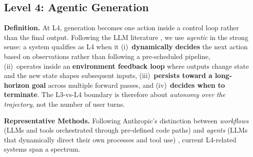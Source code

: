 \documentclass{llmxive}
\begin{document}

\subsection{Level 4: Agentic Generation}
\label{subsec:level4}



\textbf{Definition.} At L4, generation becomes one action inside a control loop rather than the final output. Following the LLM literature \citep{anthropic2024agents}, we use \emph{agentic} in the strong sense: a system qualifies as L4 when it (i)~\textbf{dynamically decides} the next action based on observations rather than following a pre-scheduled pipeline, (ii)~operates inside an \textbf{environment feedback loop} where outputs change state and the new state shapes subsequent inputs, (iii)~\textbf{persists toward a long-horizon goal} across multiple forward passes, and (iv)~\textbf{decides when to terminate}. The L3-vs-L4 boundary is therefore about \emph{autonomy over the trajectory}, not the number of user turns.

\textbf{Representative Methods.} Following Anthropic's distinction between \emph{workflows} (LLMs and tools orchestrated through pre-defined code paths) and \emph{agents} (LLMs that dynamically direct their own processes and tool use) \citep{anthropic2024agents}, current L4-related systems span a spectrum.
\end{document}
